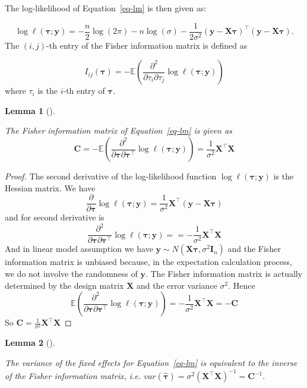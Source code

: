 \documentclass[
  a4paper,
  oneside,
  openany,
  12pt,
  onecolumn]{book}
\theoremstyle{definition}
\theoremstyle{plain}
\newtheorem{lemma}{Lemma}[chapter]
\theoremstyle{remark}
\begin{document}
The log-likelihood of Equation~\ref{eq-lm} is then given as:

\[
\log\ell(\boldsymbol{\tau};\boldsymbol{y}) = -\frac{n}{2}\log(2\pi)-n\log(\sigma)-\frac{1}{2\sigma^2}(\boldsymbol{y}-\boldsymbol{X}\boldsymbol{\tau})^\top(\boldsymbol{y}-\boldsymbol{X}\boldsymbol{\tau}).
\] The \((i,j)\)-th entry of the Fisher information matrix is defined as

\[
I_{ij}(\boldsymbol{\tau})=-\mathbb{E}\left(\frac{\partial^2}{\partial\tau_i\partial\tau_j}\log\ell(\boldsymbol{\tau};\boldsymbol{y})\right)
\] where \(\tau_i\) is the \(i\)-th entry of \(\boldsymbol{\tau}\).

\begin{lemma}[]\protect\hypertarget{lem-fim-lm}{}\label{lem-fim-lm}

The Fisher information matrix of Equation~\ref{eq-lm} is given as \[
\mathbf{C} = -\mathbb{E}\left(\frac{\partial^2}{\partial\boldsymbol{\tau}\partial\boldsymbol{\tau}^\top}\log\ell(\boldsymbol{\tau};\boldsymbol{y})\right)=\frac{1}{\sigma^2}\boldsymbol{X}^\top\boldsymbol{X}
\]

\end{lemma}

\begin{proof}
The second derivative of the log-likelihood function
\(\log\ell(\boldsymbol{\tau};\boldsymbol{y})\) is the Hessian matrix. We
have \[
\frac{\partial}{\partial\boldsymbol{\tau}}\log\ell(\boldsymbol{\tau};\boldsymbol{y})=\frac{1}{\sigma^2}\boldsymbol{X}^\top(\boldsymbol{y}-\boldsymbol{X}\boldsymbol{\tau})
\] and for second derivative is \[
\frac{\partial^2}{\partial\boldsymbol{\tau}\partial\boldsymbol{\tau}^\top}\log\ell(\boldsymbol{\tau};\boldsymbol{y})==-\frac{1}{\sigma^2}\boldsymbol{X}^\top\boldsymbol{X}
\] And in linear model assumption we have
\(\boldsymbol{y} \sim N(\mathbf{X}\boldsymbol{\tau}, \sigma^2\mathbf{I}_n)\)
and the Fisher information matrix is unbiased because, in the
expectation calculation process, we do not involve the randomness of
\(\boldsymbol{y}\). The Fisher information matrix is actually determined
by the design matrix \(\boldsymbol{X}\) and the error variance
\(\sigma^2\). Hence \[
\mathbb{E}\left(\frac{\partial^2}{\partial\boldsymbol{\tau}\partial\boldsymbol{\tau}^\top}\log\ell(\boldsymbol{\tau};\boldsymbol{y})\right)=-\frac{1}{\sigma^2}\boldsymbol{X}^\top\boldsymbol{X} = -\mathbf{C} 
\] So
\(\mathbf{C} = \frac{1}{\sigma^2}\boldsymbol{X}^\top\boldsymbol{X}\)
\end{proof}

\begin{lemma}[]\protect\hypertarget{lem-lm-var}{}\label{lem-lm-var}

The variance of the fixed effects for Equation~\ref{eq-lm} is equivalent
to the inverse of the Fisher information matrix, i.e.
\(var(\hat{\boldsymbol{\tau}})=\sigma^2(\boldsymbol{X}^\top\boldsymbol{X})^{-1} = \mathbf{C}^{-1}.\)

\end{lemma}
\end{document}
